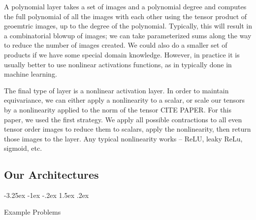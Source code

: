 \documentclass{article}
\makeatletter
\theoremstyle{definition}
\renewcommand\section{\@startsection {section}{1}{\z@}%
  {-3.25ex \@plus -1ex \@minus -.2ex}%
  {1.5ex \@plus .2ex}%
  {\raggedright\normalfont\large\bfseries}}%
\makeatother
\begin{document}
A polynomial layer takes a set of images and a polynomial degree and computes the full polynomial of all the images with each other using the tensor product of geoemtric images, up to the degree of the polynomial. Typically, this will result in a combinatorial blowup of images; we can take parameterized sums along the way to reduce the number of images created. We could also do a smaller set of products if we have some special domain knowledge. However, in practice it is usually better to use nonlinear activations functions, as in typically done in machine learning.

The final type of layer is a nonlinear activation layer. In order to maintain equivariance, we can either apply a nonlinearity to a scalar, or scale our tensors by a nonlinearity applied to the norm of the tensor CITE PAPER. For this paper, we used the first strategy. We apply all possible contractions to all even tensor order images to reduce them to scalars, apply the nonlinearity, then return those images to the layer. Any typical nonlinearity works -- ReLU, leaky ReLu, sigmoid, etc.

\subsection{Our Architectures}

\section{Example Problems}\label{sec:examples}
\end{document}
